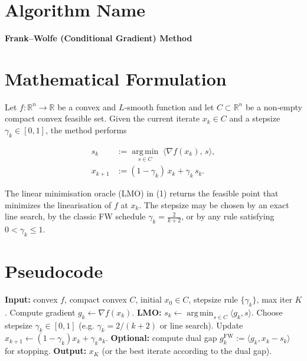 \documentclass{article}
\newcommand{\argmin}{\operatorname*{arg\,min}}
\begin{document}
\section*{Algorithm Name}
\textbf{Frank–Wolfe (Conditional Gradient) Method}

\section*{Mathematical Formulation}
Let $f:\mathbb{R}^n\rightarrow\mathbb{R}$ be a convex and $L$‑smooth function and let 
$C\subset\mathbb{R}^n$ be a non‑empty compact convex feasible set.  
Given the current iterate $x_k\in C$ and a stepsize $\gamma_k\in[0,1]$, the method performs

\[
\begin{aligned}
s_k &:= \argmin_{s\in C}\;\big\langle \nabla f(x_k),\,s\big\rangle ,\tag{1}\\[4pt]
x_{k+1} &:= (1-\gamma_k)\,x_k+\gamma_k\,s_k .\tag{2}
\end{aligned}
\]

The linear minimisation oracle (LMO) in (1) returns the feasible point that minimizes the
linearisation of $f$ at $x_k$.  The stepsize may be chosen by an exact line search,
by the classic FW schedule $\gamma_k=\frac{2}{k+2}$, or by any rule satisfying
$0<\gamma_k\le 1$.

\section*{Pseudocode}
\begin{algorithm}[H]
\caption{Frank–Wolfe (Conditional Gradient)}
\begin{algorithmic}[1]
\State \textbf{Input:} convex $f$, compact convex $C$, initial $x_0\in C$, stepsize rule $\{\gamma_k\}$, max iter $K$.
    \State Compute gradient $g_k \gets \nabla f(x_k)$.
    \State \textbf{LMO:} $s_k \gets \argmin_{s\in C}\langle g_k , s\rangle$.
    \State Choose stepsize $\gamma_k\in[0,1]$ (e.g. $\gamma_k=2/(k+2)$ or line search).
    \State Update $x_{k+1} \gets (1-\gamma_k)x_k + \gamma_k s_k$.
    \State \textbf{Optional:} compute dual gap $g_k^{\text{FW}}:=\langle g_k, x_k-s_k\rangle$ for stopping.
\EndFor
\State \textbf{Output:} $x_K$ (or the best iterate according to the dual gap).
\end{algorithmic}
\end{algorithm}
\end{document}
